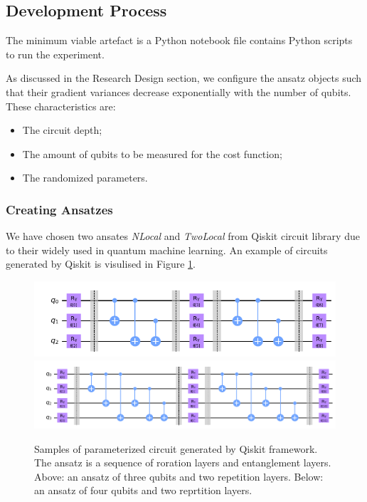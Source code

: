 \subsection{Development Process}
The minimum viable artefact is a Python notebook file contains Python scripts to run the experiment.

As discussed in the Research Design section, we configure the ansatz objects such that their gradient variances decrease exponentially with the number of qubits.
These characteristics are:
\begin{itemize}
    \item The circuit depth;
    \item The amount of qubits to be measured for the cost function;
    \item The randomized parameters.
\end{itemize}

\subsubsection{Creating Ansatzes}
We have chosen two ansates \textit{NLocal} and \textit{TwoLocal} from Qiskit circuit library due to their widely used in quantum machine learning.
An example of circuits generated by Qiskit is visulised in Figure \ref{Ansatz samples}.

\begin{figure}
    \includegraphics[width=\textwidth]{Artefact/Appendices/ansatz3-2.png}
    \includegraphics[width=\textwidth]{Artefact/Appendices/ansatz4-2.png}
    \caption{
        Samples of parameterized circuit generated by Qiskit framework.
        The ansatz is a sequence of roration layers and entanglement layers.
        Above: an ansatz of three qubits and two repetition layers.
        Below: an ansatz of four qubits and two reprtition layers.
    }
    \label{Ansatz samples}
\end{figure}

